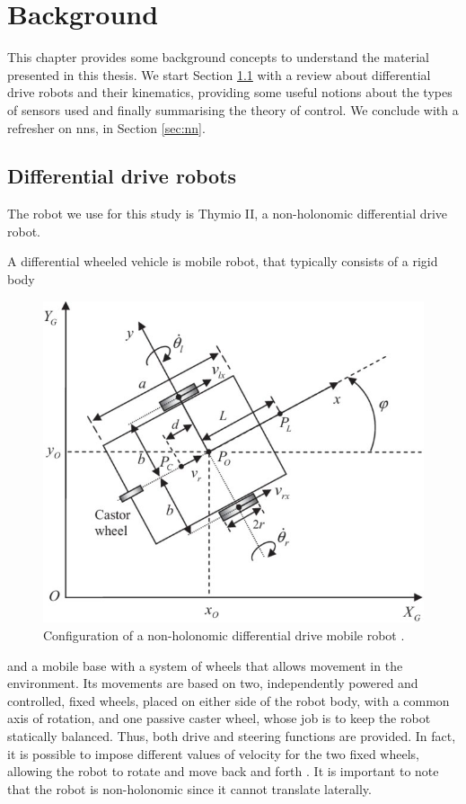 \chapter{Background}
\label{chap:background}
This chapter provides some background concepts to understand the material 
presented in this thesis. 
We start Section \ref{sec:ddr} with a review about differential drive robots and 
their kinematics, providing some useful notions about the types of sensors used 
and finally summarising the theory of control.
We conclude with a refresher on \glspl{nn}, in Section \ref{sec:nn}.

\section{Differential drive robots}
\label{sec:ddr}
The robot we use for this study is Thymio II, a non-holonomic differential drive 
robot.

A differential wheeled vehicle is mobile robot, that typically consists of a rigid 
body 
\begin{figure}[!htb]
	\centering
	\includegraphics[width=.55\textwidth]{contents/images/Non-holonomic-differential-drive-mobile-robot}
	\caption[Non-holonomic differential drive mobile robot.]{Configuration of a 
		non-holonomic differential drive mobile robot 
		\cite[][]{shojaei2011adaptive}.}
	\label{fig:differentialdrive}
\end{figure}

\noindent
and a mobile base with a system of wheels that allows movement in the 
environment. 
Its movements are based on two, independently powered and 
controlled, fixed wheels, placed on either side of the robot body, with a common 
axis of rotation, and one passive caster wheel, whose job is to keep the robot 
statically balanced. 
Thus, both drive and steering functions are provided. In fact, it is possible to 
impose different values of velocity for the two fixed wheels, allowing the robot to 
rotate and move back and forth \cite[][]{siciliano2010robotics}. It is important to 
note that the robot is non-holonomic since it cannot translate laterally.

